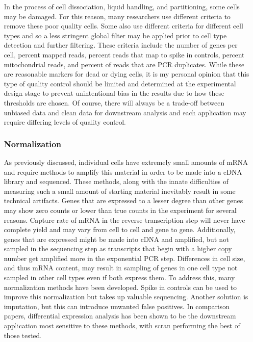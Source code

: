 \par{ In the process of cell dissociation, liquid handling, and partitioning, some cells may be damaged. For this reason, many researchers use different criteria to remove these poor quality cells. Some also use different criteria for different cell types and so a less stringent global filter may be applied prior to cell type detection and further filtering. These criteria include the number of genes per cell, percent mapped reads, percent reads that map to spike in controls, percent mitochondrial reads, and percent of reads that are PCR duplicates. While these are reasonable markers for dead or dying cells\cite{osorio}\cite{ilicic}, it is my personal opinion that this type of quality control should be limited and determined at the experimental design stage to prevent unintentional bias in the results due to how these thresholds are chosen. Of course, there will always be a trade-off between unbiased data and clean data for downstream analysis and each application may require differing levels of quality control.
}

\subsubsection{Normalization}\label{section:normalize}

\par{
As previously discussed, individual cells have extremely small amounts of mRNA and require methods to amplify this material in order to be made into a cDNA library and sequenced. These methods, along with the innate difficulties of measuring such a small amount of starting material inevitably result in some technical artifacts. Genes that are expressed to a lesser degree than other genes may show zero counts or lower than true counts in the experiment for several reasons\cite{technoise}. Capture rate of mRNA in the reverse transcription step will never have complete yield and may vary from cell to cell and gene to gene. Additionally, genes that are expressed might be made into cDNA and amplified, but not sampled in the sequencing step as transcripts that begin with a higher copy number get amplified more in the exponential PCR step. Differences in cell size, and thus mRNA content, may result in sampling of genes in one cell type not sampled in other cell types even if both express them. To address this, many normalization methods have been developed\cite{normalize1}\cite{normalize2}. Spike in controls can be used to improve this normalization\cite{marioni1} but takes up valuable sequencing. Another solution is imputation\cite{imputesc}, but this can introduce unwanted false positives\cite{fpimpute}. In comparison papers, differential expression analysis has been shown to be the downstream application most sensitive to these methods\cite{normalsc}, with scran\cite{scran} performing the best of those tested.
}

